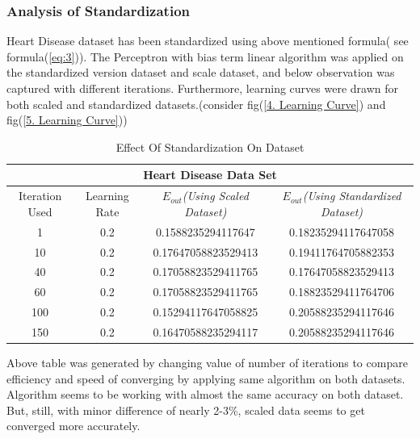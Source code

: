 \documentclass{article}
\begin{document}
\subsubsection{Analysis of Standardization}
Heart Disease dataset has been standardized using above mentioned formula( see formula(\ref{eq:3})). The Perceptron with bias term linear algorithm was applied on the standardized version dataset and scale dataset, and below observation was captured with different iterations. Furthermore, learning curves were drawn for both scaled and standardized datasets.(consider fig(\ref{4. Learning Curve}) and fig(\ref{5. Learning Curve}))
\begin{table}[H]
\begin{center}
\begin{tabular}{ |c|c|c|c| } 
\hline
\multicolumn{4}{|c|}{Heart Disease Data Set} \\
\hline
\hline
Iteration Used & Learning Rate & \(E_{out}\)\textit{(Using Scaled Dataset)} & \(E_{out}\)\textit{(Using Standardized Dataset)} \\
\hline
\hline
1 & 0.2 & 0.1588235294117647 & 0.18235294117647058 \\ 

\hline
\hline
10 & 0.2 & 0.17647058823529413 & 0.19411764705882353 \\
\hline
\hline
40 & 0.2 & 0.17058823529411765 & 0.17647058823529413 \\


\hline
\hline
60 & 0.2 & 0.17058823529411765 & 0.18823529411764706 \\


\hline
\hline
100 & 0.2 & 0.15294117647058825 & 0.20588235294117646 \\

\hline
\hline
150 & 0.2 & 0.16470588235294117 & 0.20588235294117646 \\
\hline
\end{tabular}
\caption{Effect Of Standardization On Dataset}
\end{center}
\end{table}
\par Above table was generated by changing value of number of iterations to compare efficiency and speed of converging by applying same algorithm on both datasets. Algorithm seems to be working with almost the same accuracy on both dataset. But, still, with minor difference of nearly 2-3\%, scaled data seems to get converged more accurately.\\
\end{document}
